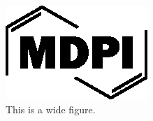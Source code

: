 \documentclass[journal,article,submit,moreauthors,pdftex]{Definitions/mdpi}
\begin{document}
\begin{figure}[H]   
    \widefigure
    \includegraphics[width=15 cm]{Definitions/logo-mdpi}
    \caption{This is a wide figure.\label{fig2}}
\end{figure}  
\end{document}
